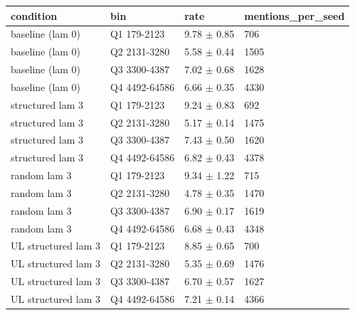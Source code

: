 \begin{tabular}{llll}
\hline
condition & bin & rate & mentions\_per\_seed \\
\hline
baseline (lam 0) & Q1 179-2123 & 9.78 $\pm$ 0.85 & 706 \\
baseline (lam 0) & Q2 2131-3280 & 5.58 $\pm$ 0.44 & 1505 \\
baseline (lam 0) & Q3 3300-4387 & 7.02 $\pm$ 0.68 & 1628 \\
baseline (lam 0) & Q4 4492-64586 & 6.66 $\pm$ 0.35 & 4330 \\
structured lam 3 & Q1 179-2123 & 9.24 $\pm$ 0.83 & 692 \\
structured lam 3 & Q2 2131-3280 & 5.17 $\pm$ 0.14 & 1475 \\
structured lam 3 & Q3 3300-4387 & 7.43 $\pm$ 0.50 & 1620 \\
structured lam 3 & Q4 4492-64586 & 6.82 $\pm$ 0.43 & 4378 \\
random lam 3 & Q1 179-2123 & 9.34 $\pm$ 1.22 & 715 \\
random lam 3 & Q2 2131-3280 & 4.78 $\pm$ 0.35 & 1470 \\
random lam 3 & Q3 3300-4387 & 6.90 $\pm$ 0.17 & 1619 \\
random lam 3 & Q4 4492-64586 & 6.68 $\pm$ 0.43 & 4348 \\
UL structured lam 3 & Q1 179-2123 & 8.85 $\pm$ 0.65 & 700 \\
UL structured lam 3 & Q2 2131-3280 & 5.35 $\pm$ 0.69 & 1476 \\
UL structured lam 3 & Q3 3300-4387 & 6.70 $\pm$ 0.57 & 1627 \\
UL structured lam 3 & Q4 4492-64586 & 7.21 $\pm$ 0.14 & 4366 \\
\hline
\end{tabular}
